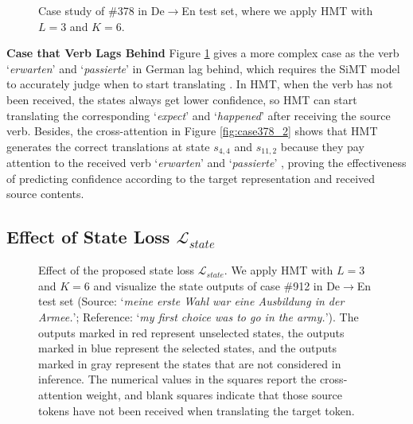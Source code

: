 \documentclass{article} %
\begin{document}
\begin{figure}[h]
\centering
{}
\caption{Case study of \#378 in De$\rightarrow$En test set, where we apply HMT with $L\!=\!3$ and $K\!=\!6$.}
\label{fig:case378}
\end{figure}
\newpage

\textbf{Case that Verb Lags Behind} Figure \ref{fig:case378} gives a more complex case as the verb `\textit{erwarten}' and `\textit{passierte}' in German lag behind, which requires the SiMT model to accurately judge when to start translating \citep{grissom-ii-etal-2014-dont,ma-etal-2019-stacl}. In HMT, when the verb has not been received, the states always get lower confidence, so HMT can start translating the corresponding `\textit{expect}' and `\textit{happened}' after receiving the source verb. Besides, the cross-attention in Figure \ref{fig:case378_2} shows that HMT generates the correct translations at state $s_{4,4}$ and $s_{11,2}$ because they pay attention to the received verb `\textit{erwarten}' and `\textit{passierte}' \citep{zhang-feng-2021-modeling-concentrated}, proving the effectiveness of predicting confidence according to the target representation and received source contents.
 
\subsection{Effect of State Loss $\mathcal{L}_{state}$}

\begin{figure}[h]
\centering
{}
\caption{Effect of the proposed state loss $\mathcal{L}_{state}$. We apply HMT with $L\!=\!3$ and $K\!=\!6$ and visualize the state outputs of case \#912 in De$\rightarrow$En test set (Source: `\textit{meine erste Wahl war eine Ausbildung in der Armee.}'; Reference: `\textit{my first choice was to go in the army.}'). The outputs marked in red represent unselected states, the outputs marked in blue represent the selected states, and the outputs marked in gray represent the states that are not considered in inference. The numerical values in the squares report the cross-attention weight, and blank squares indicate that those source tokens have not been received when translating the target token.}
\label{fig:case912}
\end{figure}
\end{document}
